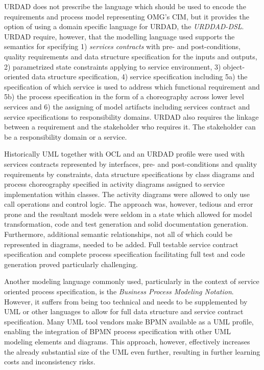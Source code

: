 URDAD does not prescribe the language which should be used to encode the requirements and process model representing OMG's CIM, but it provides the option of using a domain specific language for URDAD, the \emph{URDDAD-DSL}. URDAD require, however, that the modelling language used supports the semantics for specifying 1) \emph{services contracts} with pre- and post-conditions, quality requirements and data structure specification for the inputs and outputs, 2) parametrized state constraints applying to service environment, 3) object-oriented data structure specification, 4) service specification including 5a) the specification of which service is used to address which functional requirement and 5b) the process specification in the form of a choreography across lower level services and 6) the assigning of model artifacts including services contract and service specifications to responsibility domains. URDAD also requires the linkage between a requirement and the stakeholder who requires it. The stakeholder can be a responsibility domain or a service.

Historically UML together with OCL and an URDAD profile were used with services contracts represented by interfaces, pre- and post-conditions and quality requirements by constraints, data structure specifications by class diagrams and process choreography specified in activity diagrams assigned to service implementation within classes. The activity diagrams were allowed to only use call operations and control logic. The approach was, however, tedious and error prone and the resultant models were seldom in a state which allowed for model transformation, code and test generation and solid documentation generation. Furthermore, additional semantic relationships, not all of which could be represented in diagrams, needed to be added. Full testable service contract specification and complete process specification facilitating full test and code generation proved particularly challenging.

Another modeling language commonly used, particularly in the context of service oriented process specification, is the \emph{Business Process Modeling Notation}. However, it suffers from being too technical\cite{fouad_embedding_2010} and needs to be supplemented by UML or other languages to allow for full data structure and service contract specification. Many UML tool vendors make BPMN available as a UML profile, enabling the integration of BPMN process specification with other UML modeling elements and diagrams. This approach, however, effectively increases the already substantial size of the UML even further, resulting in further learning costs and inconsistency risks.

